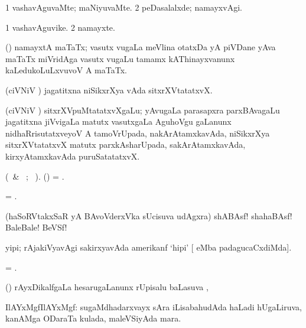 \bentry
{} 
\gl{\kirxvi} 
\bmng
\bnum
\num{1} vashavAguvaMte; maNiyuvaMte. 
\num{2} peDasalalxde; namayxvAgi.
\enum
\emng
\eentry

\bentry
{} 
\gl{\nA} 
\bmng
\bnum
\num{1} vashavAguvike. 
\num{2} namayxte.
\enum
\emng
\eentry

\bentry
{}
\gl{\nA} 
\bmng
(\Bwvi) namayxtA maTaTx; vasutx \mo vugaLa meVlina otatxDa yA piVDane yAva maTaTx miVridAga vasutx \mo vugaLu tamamx kAThinayxvanunx kaLedukoLuLxvuvoV A maTaTx.
\emng
\eentry

\bentry
{} 
\gl{\nA} 
\bmng
(ciVNiV \tashA) jagatitxna niSikxrXya vAda sitxrXVtatatxvX.
\emng
\eentry

\bentry
{}
\gl{\nA}
\bmng
(ciVNiV \tashA) sitxrXVpuMtatatxvXgaLu; yAvugaLa parasapxra parxBAvagaLu jagatitxna jiVvigaLa matutx vasutxgaLa AguhoVgu gaLanunx nidhaRrisutatxveyoV A tamoVrUpada, 	nakArAtamxkavAda, niSikxrXya sitxrXVtatatxvX matutx parxkAsharUpada, sakArAtamxkavAda, kirxyAtamxkavAda puruSatatatxvX. \quad {}
\emng
\eentry

\bentry
{} 
\gl{\akirx} 
\bmng
(\BU\ \& \BUkaq\ ; \vakaq\ ). 
(\ame) = .
\emng
\eentry

\bentry
{} 
\gl{\nA} 
\bmng
= .
\emng
\eentry

\bentry
{} 
\gl{\BAavayx} 
\bmng
(haSoRVtakxSaR yA BAvoVderxVka sUcisuva udAgxra) shABAsf! shahaBAsf! BaleBale! BeVSf! 
\emng
\eentry

\bentry
{} 
\gl{\nA} 
\bmng
yipi; rAjakiVyavAgi sakirxyavAda amerikanf `hipi'   [ eMba padagucaCxdiMda].
\emng
\eentry

\bentry
{} 
\gl{\nA}
\bmng
= .
\emng
\eentry

\bentry
{} 
\gl{\uparx}  
\bmng
(\ravi) rAyxDikalfgaLa hesarugaLanunx rUpisalu baLasuva \uparx, \udA\ 
\emng
\eentry

\bentry
{} 
\gl{\nA} 
\bmng
IlAYxMgfIlAYxMgf: 
\banum
{}  sugaMdhadarxvayx sAra iLisabahudAda haLadi hUgaLiruva, kanAMga ODaraTa kulada, maleVSiyAda mara. 

